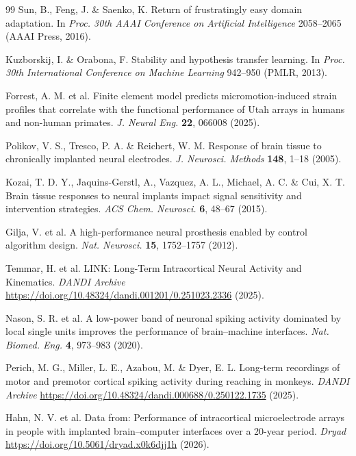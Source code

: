\begin{thebibliography}{99}
 Sun, B., Feng, J. \& Saenko, K. Return of frustratingly easy domain adaptation. In \textit{Proc. 30th AAAI Conference on Artificial Intelligence} 2058--2065 (AAAI Press, 2016).

 Kuzborskij, I. \& Orabona, F. Stability and hypothesis transfer learning. In \textit{Proc. 30th International Conference on Machine Learning} 942--950 (PMLR, 2013).

 Forrest, A. M. et al. Finite element model predicts micromotion-induced strain profiles that correlate with the functional performance of Utah arrays in humans and non-human primates. \textit{J. Neural Eng.} \textbf{22}, 066008 (2025).

 Polikov, V. S., Tresco, P. A. \& Reichert, W. M. Response of brain tissue to chronically implanted neural electrodes. \textit{J. Neurosci. Methods} \textbf{148}, 1--18 (2005).

 Kozai, T. D. Y., Jaquins-Gerstl, A., Vazquez, A. L., Michael, A. C. \& Cui, X. T. Brain tissue responses to neural implants impact signal sensitivity and intervention strategies. \textit{ACS Chem. Neurosci.} \textbf{6}, 48--67 (2015).

 Gilja, V. et al. A high-performance neural prosthesis enabled by control algorithm design. \textit{Nat. Neurosci.} \textbf{15}, 1752--1757 (2012).

 Temmar, H. et al. LINK: Long-Term Intracortical Neural Activity and Kinematics. \textit{DANDI Archive} \url{https://doi.org/10.48324/dandi.001201/0.251023.2336} (2025).

 Nason, S. R. et al. A low-power band of neuronal spiking activity dominated by local single units improves the performance of brain--machine interfaces. \textit{Nat. Biomed. Eng.} \textbf{4}, 973--983 (2020).

 Perich, M. G., Miller, L. E., Azabou, M. \& Dyer, E. L. Long-term recordings of motor and premotor cortical spiking activity during reaching in monkeys. \textit{DANDI Archive} \url{https://doi.org/10.48324/dandi.000688/0.250122.1735} (2025).

 Hahn, N. V. et al. Data from: Performance of intracortical microelectrode arrays in people with implanted brain--computer interfaces over a 20-year period. \textit{Dryad} \url{https://doi.org/10.5061/dryad.x0k6djj1h} (2026).


\end{thebibliography}
